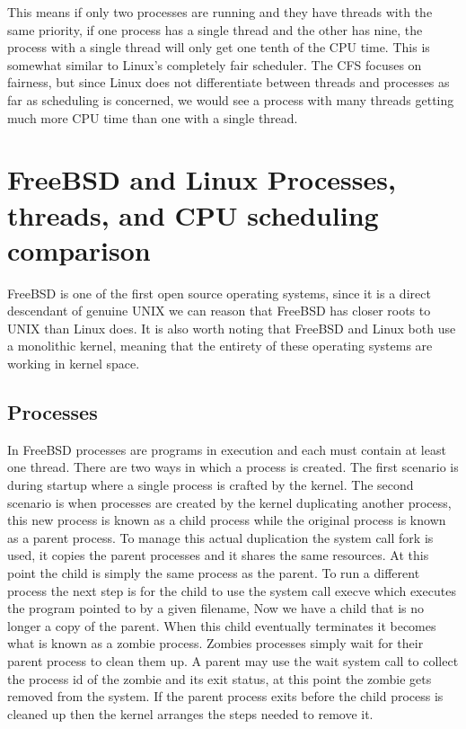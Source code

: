 \documentclass[letterpaper, 10pt, onecolumn, draftclsnofoot]{IEEEtran}
\begin{document}
This means if only two processes are running and they have threads with the same priority, if one process has a single thread and the other has nine, the process with a single thread will only get one tenth of the CPU time. This is somewhat similar to Linux's completely fair scheduler. The CFS focuses on fairness, but since Linux does not differentiate between threads and processes as far as scheduling is concerned, we would see a process with many threads getting much more CPU time than one with a single thread.\cite{linux,wi_p1}

\section{FreeBSD and Linux Processes, threads, and CPU scheduling comparison}

FreeBSD is one of the first open source operating systems, since it is a direct descendant of genuine UNIX we can reason that FreeBSD has closer roots to UNIX than Linux does. It is also worth noting that FreeBSD and Linux both use a monolithic kernel, meaning that the entirety of these operating systems are working in kernel space.\cite{BSD_ORG}

\subsection{Processes}

In FreeBSD processes are programs in execution and each must contain at least one thread. There are two ways in which a process is created. The first scenario is during startup where a single process is crafted by the kernel. The second scenario is when processes are created by the kernel duplicating another process, this new process is known as a child process while the original process is known as a parent process. To manage this actual duplication the system call fork is used, it copies the parent processes and it shares the same resources. At this point the child is simply the same process as the parent. To run a different process the next step is for the child to use the system call execve which executes the program pointed to by a given filename, Now we have a child that is no longer a copy of the parent. When this child eventually terminates it becomes what is known as a zombie process. Zombies processes simply wait for their parent process to clean them up. A parent may use the wait system call to collect the process id of the zombie and its exit status, at this point the zombie gets removed from the system. If the parent process exits before the child process is cleaned up then the kernel arranges the steps needed to remove it.\cite{BSD}
\end{document}
